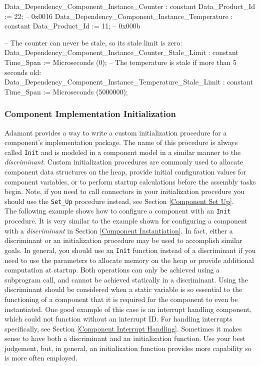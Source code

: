 \vspace{5mm} %
\begin{adacode}
  Data_Dependency_Component_Instance_Counter : constant Data_Product_Id := 22; -- 0x0016
  Data_Dependency_Component_Instance_Temperature : constant Data_Product_Id := 11; -- 0x000b

  -- The counter can never be stale, so its stale limit is zero:
  Data_Dependency_Component_Instance_Counter_Stale_Limit : constant Time_Span := Microseconds (0);
  -- The temperature is stale if more than 5 seconds old:
  Data_Dependency_Component_Instance_Temperature_Stale_Limit : constant Time_Span := Microseconds (5000000);
\end{adacode}
\vspace{5mm} %

\subsubsection{Component Implementation Initialization} \label{Component Implementation Initialization}

Adamant provides a way to write a custom initialization procedure for a component's implementation package. The name of this procedure is always called \texttt{Init} and is modeled in a component model in a similar manner to the \textit{discriminant}. Custom initialization procedures are commonly used to allocate component data structures on the heap, provide initial configuration values for component variables, or to perform startup calculations before the assembly tasks begin. Note, if you need to call connectors in your initialization procedure you should use the \texttt{Set\_Up} procedure instead, see Section \ref{Component Set Up}. \\

The following example shows how to configure a component with an \texttt{Init} procedure. It is very similar to the example shown for configuring a component with a \textit{discriminant} in Section \ref{Component Instantiation}. In fact, either a discriminant or an initialization procedure may be used to accomplish similar goals. In general, you should use an \texttt{Init} function instead of a discriminant if you need to use the parameters to allocate memory on the heap or provide additional computation at startup. Both operations can only be achieved using a subprogram call, and cannot be achieved statically in a discriminant. Using the discriminant should be considered when a static variable is so essential to the functioning of a component that it is required for the component to even be instantiated. One good example of this case is an interrupt handling component, which could not function without an interrupt ID. For handling interrupts specifically, see Section \ref{Component Interrupt Handling}. Sometimes it makes sense to have both a discriminant and an initialization function. Use your best judgement, but, in general, an initialization function provides more capability so is more often employed. \\

